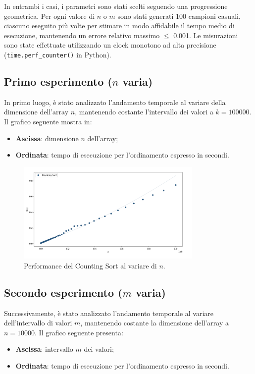 \documentclass[a4paper, 12pt, oneside]{book}
\begin{document}
\noindent In entrambi i casi, i parametri sono stati scelti seguendo una progressione geometrica.
Per ogni valore di \(n\) o \(m\) sono stati generati 100 campioni casuali, ciascuno eseguito più volte per stimare in modo affidabile il tempo medio di esecuzione, mantenendo un errore relativo massimo \(\leq\) 0.001.
Le misurazioni sono state effettuate utilizzando un clock monotono ad alta precisione (\texttt{time.perf\_counter()} in Python). \\

\subsection{Primo esperimento ($n$ varia)}

\noindent
In primo luogo, è stato analizzato l'andamento temporale al variare della dimensione dell'array \(n\), mantenendo costante l'intervallo dei valori a \(k = 100000\). 
Il grafico seguente mostra in:
\begin{itemize}
    \item \textbf{Ascissa}: dimensione \(n\) dell'array;
    \item \textbf{Ordinata}: tempo di esecuzione per l'ordinamento espresso in secondi.
\end{itemize}

\begin{figure}[H]
    \centering
    \includegraphics[width=0.8\textwidth]{images/grafico_counting_sort_n.png}
    \caption{Performance del Counting Sort al variare di \(n\).}
    \label{fig:counting_sort_n}
\end{figure}

\subsection{Secondo esperimento ($m$ varia)}

\noindent Successivamente, è stato analizzato l'andamento temporale al variare dell'intervallo di valori \(m\), mantenendo costante la dimensione dell'array a \(n = 10000\). 
Il grafico seguente presenta:
\begin{itemize}
    \item \textbf{Ascissa}: intervallo \(m\) dei valori;
    \item \textbf{Ordinata}: tempo di esecuzione per l'ordinamento espresso in secondi.
\end{itemize}
\end{document}
